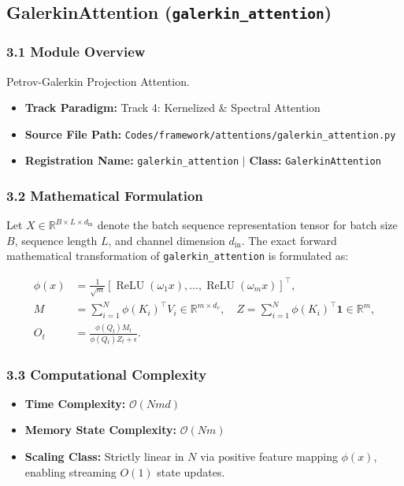 \subsection{GalerkinAttention (\texttt{galerkin\_attention})}
\label{sec:app_module_galerkin_attention}

\subsubsection*{3.1 Module Overview}
Petrov-Galerkin Projection Attention.
\begin{itemize}
    \item \textbf{Track Paradigm:} Track 4: Kernelized \& Spectral Attention
    \item \textbf{Source File Path:} \texttt{Codes/framework/attentions/galerkin\_attention.py}
    \item \textbf{Registration Name:} \texttt{galerkin\_attention} $\mid$ \textbf{Class:} \texttt{GalerkinAttention}
\end{itemize}

\subsubsection*{3.2 Mathematical Formulation}
Let $X \in \mathbb{R}^{B \times L \times d_{\text{in}}}$ denote the batch sequence representation tensor for batch size $B$, sequence length $L$, and channel dimension $d_{\text{in}}$. The exact forward mathematical transformation of \texttt{galerkin\_attention} is formulated as:

\begin{align}
\phi(x) &= \frac{1}{\sqrt{m}} \left[ \operatorname{ReLU}(\omega_1 x), \dots, \operatorname{ReLU}(\omega_m x) \right]^\top, \\
M &= \sum_{i=1}^N \phi(K_i)^\top V_i \in \mathbb{R}^{m \times d_v}, \quad Z = \sum_{i=1}^N \phi(K_i)^\top \mathbf{1} \in \mathbb{R}^m, \\
O_t &= \frac{\phi(Q_t) M_t}{\phi(Q_t) Z_t + \epsilon}.
\end{align}


\subsubsection*{3.3 Computational Complexity}
\begin{itemize}
    \item \textbf{Time Complexity:} $\mathcal{O}(N m d)$
    \item \textbf{Memory State Complexity:} $\mathcal{O}(N m)$
    \item \textbf{Scaling Class:} Strictly linear in $N$ via positive feature mapping $\phi(x)$, enabling streaming $O(1)$ state updates.
\end{itemize}

